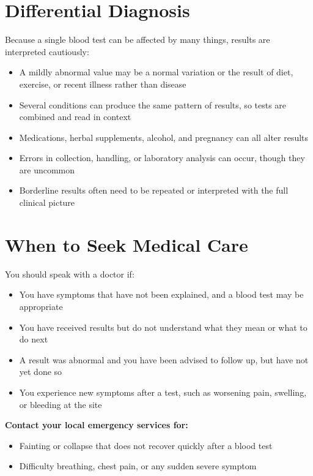\section*{Differential Diagnosis}
Because a single blood test can be affected by many things, results are interpreted cautiously:

\begin{itemize}
    \item A mildly abnormal value may be a normal variation or the result of diet, exercise, or recent illness rather than disease
    \item Several conditions can produce the same pattern of results, so tests are combined and read in context
    \item Medications, herbal supplements, alcohol, and pregnancy can all alter results
    \item Errors in collection, handling, or laboratory analysis can occur, though they are uncommon
    \item Borderline results often need to be repeated or interpreted with the full clinical picture
\end{itemize}

\section*{When to Seek Medical Care}
You should speak with a doctor if:

\begin{itemize}
    \item You have symptoms that have not been explained, and a blood test may be appropriate
    \item You have received results but do not understand what they mean or what to do next
    \item A result was abnormal and you have been advised to follow up, but have not yet done so
    \item You experience new symptoms after a test, such as worsening pain, swelling, or bleeding at the site
\end{itemize}

\textbf{Contact your local emergency services for:}
\begin{itemize}
    \item Fainting or collapse that does not recover quickly after a blood test
    \item Difficulty breathing, chest pain, or any sudden severe symptom
\end{itemize}

